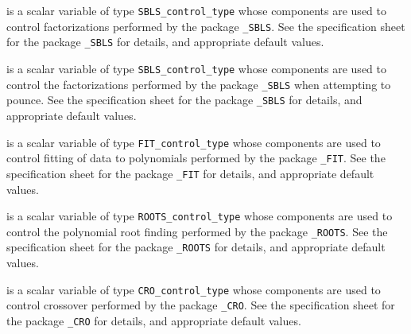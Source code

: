 \begin{description}
 is a scalar variable of type
{\tt SBLS\_control\_type}
whose components are used to control factorizations
performed by the package
{\tt \libraryname\_SBLS}.
See the specification sheet for the package
{\tt \libraryname\_SBLS}
for details, and appropriate default values.

 is a scalar variable of type
{\tt SBLS\_control\_type}
whose components are used to control the factorizations
performed by the package
{\tt \libraryname\_SBLS} when attempting to pounce.
See the specification sheet for the package
{\tt \libraryname\_SBLS}
for details, and appropriate default values.

 is a scalar variable of type
{\tt FIT\_control\_type}
whose components are used to control fitting of data to polynomials
performed by the package
{\tt \libraryname\_FIT}.
See the specification sheet for the package
{\tt \libraryname\_FIT}
for details, and appropriate default values.

 is a scalar variable of type
{\tt ROOTS\_control\_type}
whose components are used to control the polynomial root finding
performed by the package
{\tt \libraryname\_ROOTS}.
See the specification sheet for the package
{\tt \libraryname\_ROOTS}
for details, and appropriate default values.

 is a scalar variable of type
{\tt CRO\_control\_type}
whose components are used to control crossover
performed by the package
{\tt \libraryname\_CRO}.
See the specification sheet for the package
{\tt \libraryname\_CRO}
for details, and appropriate default values.

\end{description}
